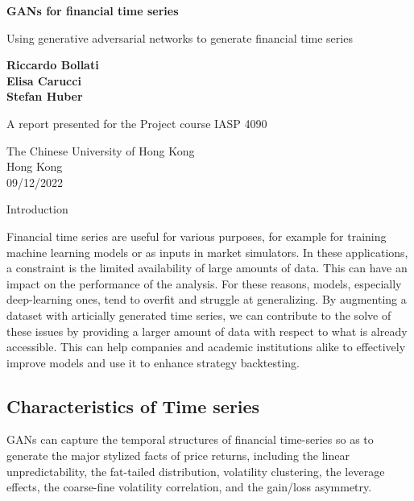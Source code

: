 \documentclass{article}
\begin{document}
\begin{titlepage}
    \begin{center}
        \vspace*{1cm}
            
        \Huge
        \textbf{GANs for financial time series}
            
        \vspace{0.5cm}
        \LARGE
        Using generative adversarial networks to generate financial time series
            
        \vspace{1.5cm}
            
        \textbf{Riccardo Bollati}\\
        \textbf{Elisa Carucci}\\
        \textbf{Stefan Huber}

            
        \vfill
            
        A report presented for the Project course IASP 4090\\
            
        \vspace{0.8cm}
            
        \Large
        The Chinese University of Hong Kong\\
        Hong Kong\\
        09/12/2022
            
    \end{center}
\end{titlepage}


\begin{center}
    {\huge{Introduction}}
\end{center}  
\begin{multicols}{2}
    Financial time series are useful for various purposes, for example for training machine learning models or as inputs in market simulators. In these applications, a constraint is the limited availability of large amounts of data. This can have an impact on the performance of the analysis. For these reasons, models, especially deep-learning ones, tend to overfit and struggle at generalizing. By augmenting a dataset with articially generated time series, we can contribute to the solve of these issues by providing a larger amount of data with respect to what is already accessible. This can help companies and academic institutions alike to effectively improve models and use it to enhance strategy backtesting. 
    \subsection*{Characteristics of Time series}
    GANs can capture the temporal structures of financial time-series so as to generate the major stylized facts of price returns, including the linear unpredictability, the fat-tailed distribution, volatility clustering, the leverage effects, the coarse-fine volatility correlation, and the gain/loss asymmetry. 
\end{multicols}    
\end{document}
